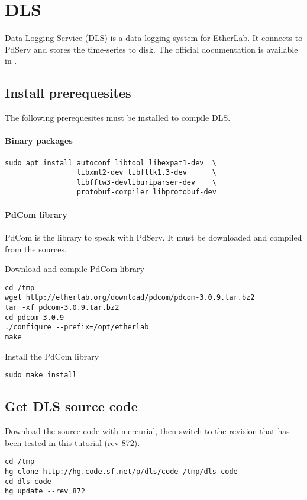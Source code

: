 \chapter{DLS}


\label{chap:dls}
Data Logging Service (DLS) is a data logging system for EtherLab. It
connects to PdServ and stores the time-series to disk.
The official documentation is available in \cite{dls_user_manual}.


\section{Install prerequesites}

The following prerequesites must be installed to compile DLS.

\subsubsection{Binary packages}
\begin{verbatim}
sudo apt install autoconf libtool libexpat1-dev  \
                 libxml2-dev libfltk1.3-dev      \
                 libfftw3-devliburiparser-dev    \
                 protobuf-compiler libprotobuf-dev
\end{verbatim}

\subsubsection{PdCom library}
PdCom is the library to speak with PdServ. It must be downloaded and
compiled from the sources.

\noindent Download and compile PdCom library
\begin{verbatim}
cd /tmp
wget http://etherlab.org/download/pdcom/pdcom-3.0.9.tar.bz2
tar -xf pdcom-3.0.9.tar.bz2
cd pdcom-3.0.9
./configure --prefix=/opt/etherlab
make
\end{verbatim}

\noindent Install the PdCom library
\begin{verbatim}
sudo make install
\end{verbatim}



\section{Get DLS source code}
Download the source code with mercurial, then switch to the revision
that has been tested in this tutorial (rev 872).
\begin{verbatim}
cd /tmp
hg clone http://hg.code.sf.net/p/dls/code /tmp/dls-code
cd dls-code
hg update --rev 872
\end{verbatim}

